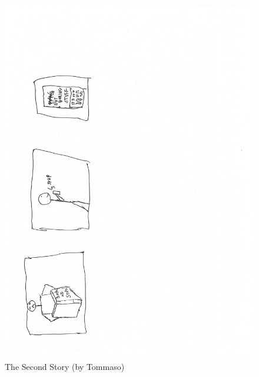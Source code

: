 \documentclass[12pt]{scrartcl}
\begin{document}
	\begin{figure}[H]
        		\centering
       		\includegraphics[width=\textwidth]{sketches/story2.pdf}
       		\caption{The Second Story (by Tommaso)}
        		\label{story2}
	\end{figure}
	
\end{document}
